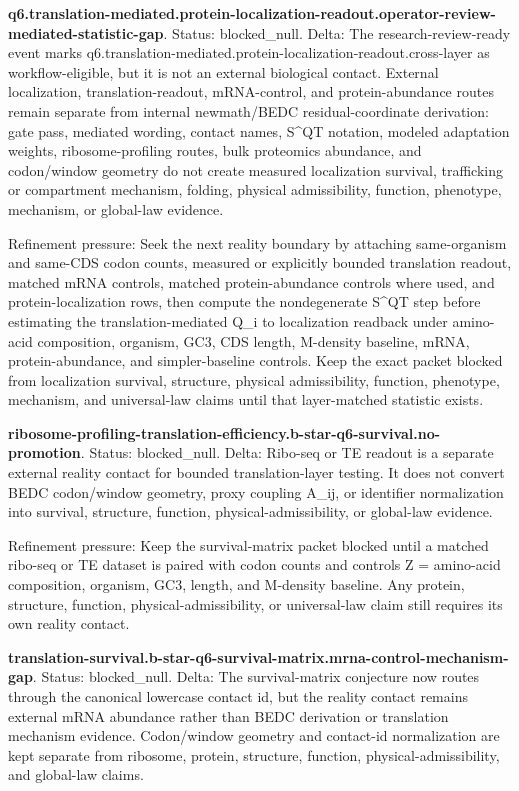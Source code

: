 \textbf{q6.translation-mediated.protein-localization-readout.operator-review-mediated-statistic-gap}. Status: blocked\_null. Delta: The research-review-ready event marks q6.translation-mediated.protein-localization-readout.cross-layer as workflow-eligible, but it is not an external biological contact. External localization, translation-readout, mRNA-control, and protein-abundance routes remain separate from internal newmath/BEDC residual-coordinate derivation: gate pass, mediated wording, contact names, S\textasciicircum{}QT notation, modeled adaptation weights, ribosome-profiling routes, bulk proteomics abundance, and codon/window geometry do not create measured localization survival, trafficking or compartment mechanism, folding, physical admissibility, function, phenotype, mechanism, or global-law evidence.

Refinement pressure: Seek the next reality boundary by attaching same-organism and same-CDS codon counts, measured or explicitly bounded translation readout, matched mRNA controls, matched protein-abundance controls where used, and protein-localization rows, then compute the nondegenerate S\textasciicircum{}QT step before estimating the translation-mediated Q\_i to localization readback under amino-acid composition, organism, GC3, CDS length, M-density baseline, mRNA, protein-abundance, and simpler-baseline controls. Keep the exact packet blocked from localization survival, structure, physical admissibility, function, phenotype, mechanism, and universal-law claims until that layer-matched statistic exists.

\textbf{ribosome-profiling-translation-efficiency.b-star-q6-survival.no-promotion}. Status: blocked\_null. Delta: Ribo-seq or TE readout is a separate external reality contact for bounded translation-layer testing. It does not convert BEDC codon/window geometry, proxy coupling A\_ij, or identifier normalization into survival, structure, function, physical-admissibility, or global-law evidence.

Refinement pressure: Keep the survival-matrix packet blocked until a matched ribo-seq or TE dataset is paired with codon counts and controls Z = amino-acid composition, organism, GC3, length, and M-density baseline. Any protein, structure, function, physical-admissibility, or universal-law claim still requires its own reality contact.

\textbf{translation-survival.b-star-q6-survival-matrix.mrna-control-mechanism-gap}. Status: blocked\_null. Delta: The survival-matrix conjecture now routes through the canonical lowercase contact id, but the reality contact remains external mRNA abundance rather than BEDC derivation or translation mechanism evidence. Codon/window geometry and contact-id normalization are kept separate from ribosome, protein, structure, function, physical-admissibility, and global-law claims.


